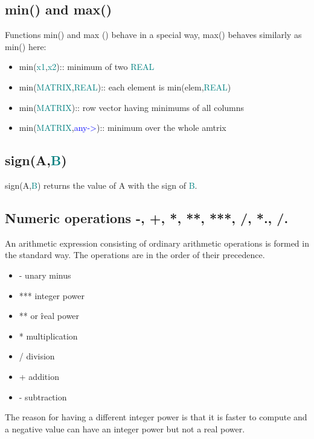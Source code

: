 {\subsection{\textcolor{VioletRed}{min}() and \textcolor{VioletRed}{max}()} 
\label{minmax} 
Functions \textcolor{VioletRed}{min}() and max () 
behave in a special way, \textcolor{VioletRed}{max}() behaves similarly as \textcolor{VioletRed}{min}() here: 
\begin{itemize} 
\item \textcolor{VioletRed}{min}(\textcolor{teal}{x1},\textcolor{teal}{x2}):: minimum of two \textcolor{teal}{REAL} 
\item \textcolor{VioletRed}{min}(\textcolor{teal}{MATRIX},\textcolor{teal}{REAL}):: each element is \textcolor{VioletRed}{min}(elem,\textcolor{teal}{REAL}) 
\item \textcolor{VioletRed}{min}(\textcolor{teal}{MATRIX}):: row vector having minimums of all columns 
\item \textcolor{VioletRed}{min}(\textcolor{teal}{MATRIX},\textcolor{blue}{any->}):: minimum over the whole amtrix 
\end{itemize} 
\subsection{\textcolor{VioletRed}{sign}(A,\textcolor{teal}{B})} 
\label{sign} 
\textcolor{VioletRed}{sign}(A,\textcolor{teal}{B}) returns the value of A with the sign of \textcolor{teal}{B}. 
\subsection{Numeric operations -, +, *, **, ***, /, *., /.} 
\label{numer} 
An arithmetic expression consisting of ordinary arithmetic operations is formed in 
the standard way. The operations are in the order of their precedence. 
\begin{itemize} 
\item - unary minus 
\item *** integer power 
\item ** or \^ real power 
\item * multiplication 
\item / division 
\item + addition 
\item - subtraction 
\end{itemize} 
 
The reason for having a different integer power is that it is faster to compute and a negative 
value can have an integer power but not a real power. 
 
}
